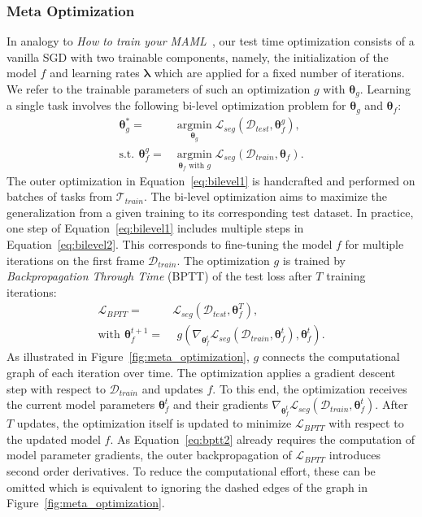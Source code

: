 \documentclass{article}
\begin{document}
    \subsubsection{Meta Optimization}
In analogy to \textit{How to train your MAML}~\cite{how_train_maml}, our test time optimization consists of a vanilla SGD with two trainable components, namely, the initialization of the model $f$ and learning rates $\boldsymbol \lambda$ which are applied for a fixed number of iterations.
We refer to the trainable parameters of such an optimization $g$ with $\boldsymbol \theta_g$.
Learning a single task involves the following bi-level optimization problem for $\boldsymbol \theta_g$ and $\boldsymbol \theta_f$:
\begin{align}
            \boldsymbol \theta_g^* = & \operatorname*{argmin}_{\boldsymbol \theta_g} \mathcal{L}_{seg}(\mathcal{D}_{test}, \boldsymbol \theta_f^g) \label{eq:bilevel1},\\
\text{s.t.} \,\ \boldsymbol \theta_f^g = & \operatorname*{argmin}_{\boldsymbol \theta_f \text{ with } g} \mathcal{L}_{seg}(\mathcal{D}_{train}, \boldsymbol \theta_f) \label{eq:bilevel2}.
        \end{align}
The outer optimization in Equation~\eqref{eq:bilevel1} is handcrafted and performed on batches of tasks from $\mathcal{T}_{train}$.
The bi-level optimization aims to maximize the generalization from a given training to its corresponding test dataset.
In practice, one step of Equation~\eqref{eq:bilevel1} includes multiple steps in Equation~\eqref{eq:bilevel2}.
This corresponds to fine-tuning the model $f$ for multiple iterations on the first frame $\mathcal{D}_{train}$. The optimization $g$ is trained by \textit{Backpropagation Through Time} (BPTT) of the test loss after $T$ training iterations:
\begin{align}
\mathcal{L}_{BPTT} = & \mathcal{L}_{seg}(\mathcal{D}_{test}, \boldsymbol \theta_f^T) \label{eq:bptt1}, \\
\text{with} \,\ \boldsymbol \theta_f^{t+1} = & \,\ g(\nabla_{\boldsymbol \theta_f^t} \mathcal{L}_{seg}(\mathcal{D}_{train}, \boldsymbol \theta_f^t), \boldsymbol \theta_f^t) \label{eq:bptt2}.
        \end{align}
As illustrated in Figure~\ref{fig:meta_optimization}, $g$ connects the computational graph of each iteration over time.
The optimization applies a gradient descent step with respect to $\mathcal{D}_{train}$ and updates $f$.
To this end, the optimization receives the current model parameters $\boldsymbol \theta_f^t$ and their gradients $\nabla_{\boldsymbol \theta_f^t} \mathcal{L}_{seg}(\mathcal{D}_{train}, \boldsymbol \theta_f^t)$.
After $T$ updates, the optimization itself is updated to minimize $\mathcal{L}_{BPTT}$ with respect to the updated model $f$.
As Equation~\eqref{eq:bptt2} already requires the computation of model parameter gradients, the outer backpropagation of $\mathcal{L}_{BPTT}$ introduces second order derivatives. To reduce the computational effort, these can be omitted which is equivalent to ignoring the dashed edges of the graph in Figure~\ref{fig:meta_optimization}.
\end{document}
